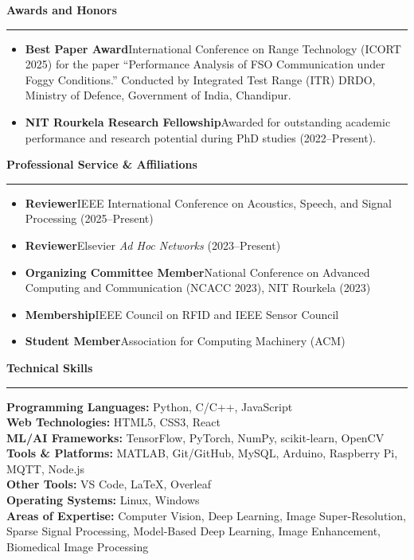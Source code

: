 \documentclass[a4paper,11pt]{article}
\renewcommand{\section}[1]{%
  \vspace{8pt}%
  {\large\scshape\raggedright #1}%
  \vspace{3pt}\hrule\vspace{4pt}%
}
\newcommand{\resumeItem}[2]{
  \item{
    \textbf{#1}{\hspace{0.5mm}#2 \vspace{-0.5mm}}
  }
}
\begin{document}
\section{\textbf{Awards and Honors}}
  \begin{itemize}[leftmargin=*,labelsep=1.5mm,topsep=0pt,partopsep=0pt,itemsep=4pt,parsep=0pt]
    \resumeItem{Best Paper Award}{International Conference on Range Technology (ICORT 2025) for the paper ``Performance Analysis of FSO Communication under Foggy Conditions.'' Conducted by Integrated Test Range (ITR) DRDO, Ministry of Defence, Government of India, Chandipur.}
    \resumeItem{NIT Rourkela Research Fellowship}{Awarded for outstanding academic performance and research potential during PhD studies (2022--Present).}
  \end{itemize}

\section{\textbf{Professional Service \& Affiliations}}
  \begin{itemize}[leftmargin=*,labelsep=1.5mm,topsep=0pt,partopsep=0pt,itemsep=4pt,parsep=0pt]
    \resumeItem{Reviewer}{IEEE International Conference on Acoustics, Speech, and Signal Processing (2025--Present)}
    \resumeItem{Reviewer}{Elsevier \textit{Ad Hoc Networks} (2023--Present)}
    \resumeItem{Organizing Committee Member}{National Conference on Advanced Computing and Communication (NCACC 2023), NIT Rourkela (2023)}
    \resumeItem{Membership}{IEEE Council on RFID and IEEE Sensor Council}
    \resumeItem{Student Member}{Association for Computing Machinery (ACM)}
  \end{itemize}

\section{\textbf{Technical Skills}}
\begin{itemize}[leftmargin=*, label={},topsep=0pt,partopsep=0pt,itemsep=4pt,parsep=0pt]
  \small{\item{
    \textbf{Programming Languages:} Python, C/C++, JavaScript \\
    \textbf{Web Technologies:} HTML5, CSS3, React \\
    \textbf{ML/AI Frameworks:} TensorFlow, PyTorch, NumPy, scikit-learn, OpenCV \\
    \textbf{Tools \& Platforms:} MATLAB, Git/GitHub, MySQL, Arduino, Raspberry Pi, MQTT, Node.js \\
    \textbf{Other Tools:} VS Code, LaTeX, Overleaf \\
    \textbf{Operating Systems:} Linux, Windows \\
    \textbf{Areas of Expertise:} Computer Vision, Deep Learning, Image Super-Resolution, Sparse Signal Processing, Model-Based Deep Learning, Image Enhancement, Biomedical Image Processing
  }}
\end{itemize}
\end{document}
